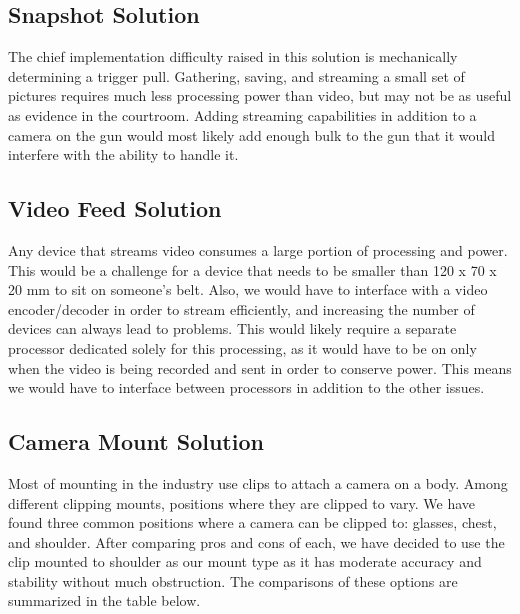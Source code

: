 \documentclass[12pt]{article}
\begin{document}
\subsection{Snapshot Solution}
The chief implementation difficulty raised in this solution is mechanically
determining a trigger pull. Gathering, saving, and streaming a small set of
pictures requires much less processing power than video, but may not be as useful
as evidence in the courtroom. Adding streaming capabilities in addition to a
camera on the gun would most likely add enough bulk to the gun that it would
interfere with the ability to handle it.

\subsection{Video Feed Solution}
Any device that streams video consumes a large portion of processing and power.
This would be a challenge for a device that needs to be smaller than 120 x 70 x
20 mm to sit on someone's belt. Also, we would have to interface with a video
encoder/decoder in order to stream efficiently, and increasing the number of
devices can always lead to problems. This would likely require a separate
processor dedicated solely for this processing, as it would have to be on only
when the video is being recorded and sent in order to conserve power. This
means we would have to interface between processors in addition to the other
issues.

\subsection{Camera Mount Solution}
Most of mounting in the industry use clips to attach a camera on a body. Among
different clipping mounts, positions where they are clipped to vary. We have
found three common positions where a camera can be clipped to: glasses, chest,
and shoulder. After comparing pros and cons of each, we have decided to use the
clip mounted to shoulder as our mount type as it has moderate accuracy and
stability without much obstruction. The comparisons of these options are
summarized in the table below.
\end{document}
